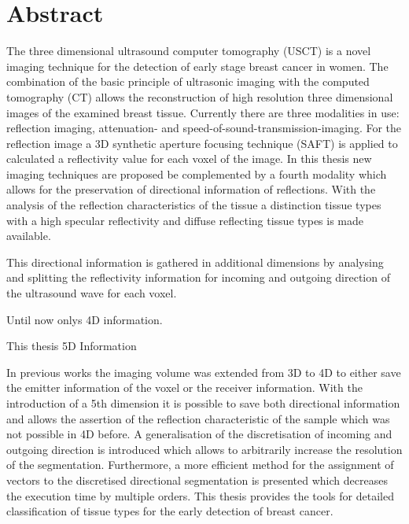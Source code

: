 \chapter*{Abstract}


The three dimensional ultrasound computer tomography (USCT) is a novel imaging technique for the detection of early stage breast cancer in women. The combination of the basic principle of ultrasonic imaging with the computed tomography (CT) allows the reconstruction of high resolution three dimensional images of the examined breast tissue. Currently there are three modalities in use: reflection imaging, attenuation- and  speed-of-sound-transmission-imaging. For the reflection image a 3D synthetic aperture focusing technique (SAFT) is applied to calculated a reflectivity value for each voxel of the image. In this thesis new imaging techniques are proposed be complemented by a fourth modality which allows for the preservation of directional information of reflections. With the analysis of the reflection characteristics of the tissue a distinction tissue types with a high specular reflectivity and diffuse reflecting tissue types is made available. 

This directional information is gathered in additional dimensions by analysing and splitting the reflectivity information for incoming and outgoing direction of the ultrasound wave for each voxel.

Until now onlys 4D information.

This thesis 5D Information

In previous works the imaging volume was extended from 3D to 4D to either save the emitter information of the voxel or the receiver information. With the introduction of a 5th dimension it is possible to save both directional information and allows the assertion of the reflection characteristic of the sample which was not possible in 4D before. A generalisation of the discretisation of incoming and outgoing direction is introduced which allows to arbitrarily increase the resolution of the segmentation. Furthermore, a more efficient method for the assignment of vectors to the discretised directional segmentation is presented which decreases the execution time by multiple orders. This thesis provides the tools for detailed classification of tissue types for the early detection of breast cancer. 

